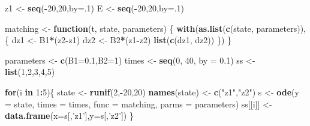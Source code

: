 \documentclass[]{article}
\newenvironment{Shaded}{\begin{snugshade}}{\end{snugshade}}
\newcommand{\ControlFlowTok}[1]{\textcolor[rgb]{0.13,0.29,0.53}{\textbf{#1}}}
\newcommand{\DataTypeTok}[1]{\textcolor[rgb]{0.13,0.29,0.53}{#1}}
\newcommand{\DecValTok}[1]{\textcolor[rgb]{0.00,0.00,0.81}{#1}}
\newcommand{\FloatTok}[1]{\textcolor[rgb]{0.00,0.00,0.81}{#1}}
\newcommand{\KeywordTok}[1]{\textcolor[rgb]{0.13,0.29,0.53}{\textbf{#1}}}
\newcommand{\NormalTok}[1]{#1}
\newcommand{\OperatorTok}[1]{\textcolor[rgb]{0.81,0.36,0.00}{\textbf{#1}}}
\newcommand{\StringTok}[1]{\textcolor[rgb]{0.31,0.60,0.02}{#1}}
\begin{document}
\begin{Shaded}
\begin{Highlighting}[]
\NormalTok{z1  <-}\StringTok{ }\KeywordTok{seq}\NormalTok{(}\OperatorTok{-}\DecValTok{20}\NormalTok{,}\DecValTok{20}\NormalTok{,}\DataTypeTok{by=}\NormalTok{.}\DecValTok{1}\NormalTok{)}
\NormalTok{E   <-}\StringTok{ }\KeywordTok{seq}\NormalTok{(}\OperatorTok{-}\DecValTok{20}\NormalTok{,}\DecValTok{20}\NormalTok{,}\DataTypeTok{by=}\NormalTok{.}\DecValTok{1}\NormalTok{)}

\NormalTok{matching <-}\StringTok{ }\ControlFlowTok{function}\NormalTok{(t, state, parameters) \{}
  \KeywordTok{with}\NormalTok{(}\KeywordTok{as.list}\NormalTok{(}\KeywordTok{c}\NormalTok{(state, parameters)), \{}
\NormalTok{    dz1 <-}\StringTok{  }\NormalTok{B1}\OperatorTok{*}\NormalTok{(z2}\OperatorTok{-}\NormalTok{z1)}
\NormalTok{    dz2 <-}\StringTok{  }\NormalTok{B2}\OperatorTok{*}\NormalTok{(z1}\OperatorTok{-}\NormalTok{z2)}
    \KeywordTok{list}\NormalTok{(}\KeywordTok{c}\NormalTok{(dz1, dz2))}
\NormalTok{  \})}
\NormalTok{\}}

\NormalTok{parameters <-}\StringTok{ }\KeywordTok{c}\NormalTok{(}\DataTypeTok{B1=}\FloatTok{0.1}\NormalTok{,}\DataTypeTok{B2=}\DecValTok{1}\NormalTok{)}
\NormalTok{times      <-}\StringTok{ }\KeywordTok{seq}\NormalTok{(}\DecValTok{0}\NormalTok{, }\DecValTok{40}\NormalTok{, }\DataTypeTok{by =} \FloatTok{0.1}\NormalTok{)}
\NormalTok{ss <-}\StringTok{ }\KeywordTok{list}\NormalTok{(}\DecValTok{1}\NormalTok{,}\DecValTok{2}\NormalTok{,}\DecValTok{3}\NormalTok{,}\DecValTok{4}\NormalTok{,}\DecValTok{5}\NormalTok{)}


\ControlFlowTok{for}\NormalTok{(i }\ControlFlowTok{in} \DecValTok{1}\OperatorTok{:}\DecValTok{5}\NormalTok{)\{}
\NormalTok{  state      <-}\StringTok{ }\KeywordTok{runif}\NormalTok{(}\DecValTok{2}\NormalTok{,}\OperatorTok{-}\DecValTok{20}\NormalTok{,}\DecValTok{20}\NormalTok{)}
  \KeywordTok{names}\NormalTok{(state) <-}\StringTok{ }\KeywordTok{c}\NormalTok{(}\StringTok{"z1"}\NormalTok{,}\StringTok{"z2"}\NormalTok{)}
\NormalTok{  s <-}\StringTok{ }\KeywordTok{ode}\NormalTok{(}\DataTypeTok{y =}\NormalTok{ state, }\DataTypeTok{times =}\NormalTok{ times, }\DataTypeTok{func =}\NormalTok{ matching, }\DataTypeTok{parms =}\NormalTok{ parameters)}
\NormalTok{  ss[[i]] <-}\StringTok{ }\KeywordTok{data.frame}\NormalTok{(}\DataTypeTok{x=}\NormalTok{s[,}\StringTok{'z1'}\NormalTok{],}\DataTypeTok{y=}\NormalTok{s[,}\StringTok{'z2'}\NormalTok{])}
\NormalTok{\}}


\end{Highlighting}
\end{Shaded}
\end{document}
